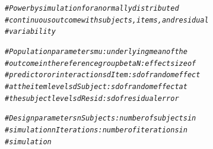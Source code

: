 \documentclass{sp}\usepackage[]{graphicx}\usepackage[]{color}
\makeatletter
\newcommand{\hlcom}[1]{\textcolor[rgb]{0.678,0.584,0.686}{\textit{#1}}}%
\newenvironment{kframe}{%
 \def\at@end@of@kframe{}%
 \ifinner\ifhmode%
  \def\at@end@of@kframe{\end{minipage}}%
  \begin{minipage}{\columnwidth}%
 \fi\fi%
 \def\FrameCommand##1{\hskip\@totalleftmargin \hskip-\fboxsep
 \colorbox{shadecolor}{##1}\hskip-\fboxsep
     \hskip-\linewidth \hskip-\@totalleftmargin \hskip\columnwidth}%
 \MakeFramed {\advance\hsize-\width
   \@totalleftmargin\z@ \linewidth\hsize
   \@setminipage}}%
 {\par\unskip\endMakeFramed%
 \at@end@of@kframe}
\newenvironment{knitrout}{}{} %
\makeatother
\begin{document}
\begin{knitrout}\small
{}\color{fgcolor}\begin{kframe}
\begin{alltt}
\hlcom{# Power by simulation for a normally distributed}
\hlcom{# continuous outcome with subjects, items, and residual}
\hlcom{# variability}

\hlcom{# Population parameters mu: underlying mean of the}
\hlcom{# outcome in the reference group betaN: effect size of}
\hlcom{# predictor or interaction sdItem: sd of random effect}
\hlcom{# at the item level sdSubject: sd of random effect at}
\hlcom{# the subject level sdResid: sd of residual error}

\hlcom{# Design parameters nSubjects: number of subjects in}
\hlcom{# simulation nIterations: number of iterations in}
\hlcom{# simulation}


\end{alltt}
\end{kframe}
\end{knitrout}
\end{document}
